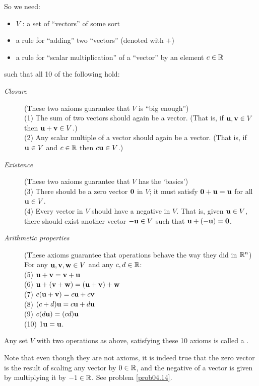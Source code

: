 So we need: 
\begin{itemize}
\item $V$ : a set of ``vectors'' of some sort
\item a rule for ``adding'' two ``vectors'' (denoted with $+$)
\item a rule for ``scalar multiplication'' of a ``vector'' by an element $c\in \mathbb{R}$
\end{itemize}
such that all 10 of the following  hold:
\begin{description}
\item[\it Closure] (These two axioms guarantee that $V$ is ``big enough'')\\
(1) The sum of two vectors should again be a vector.  (That is, if $\mathbf{u}, \mathbf{v} \in V$ then $\mathbf{u} + \mathbf{v} \in V$.)\\
(2) Any scalar multiple of a vector should again be a vector.  (That is, if $\mathbf{u} \in V$ and $c\in \mathbb{R}$ then $c\mathbf{u} \in V$.)
\item[\it Existence] (These two axioms guarantee that   $V$ has the `basics')\\
(3) There should be a zero vector $\mathbf{0}$ in $V$; it must satisfy
$\mathbf{0} + \mathbf{u} = \mathbf{u}$ for all $\mathbf{u} \in V$.\\
(4) Every vector in $V$ should have a negative in $V$.  That is, given $\mathbf{u} \in V$, there
should exist another vector $-\mathbf{u} \in V$ such that $\mathbf{u} + (-\mathbf{u}) = \mathbf{0}$.
\item[\it Arithmetic properties] (These axioms guarantee that operations behave the way they did in $\mathbb{R}^n$)\\
For any $\mathbf{u}, \mathbf{v}, \mathbf{w} \in V$ and any $c,d\in \mathbb{R}$:\\
(5) $\mathbf{u} + \mathbf{v} = \mathbf{v} + \mathbf{u}$\\
(6) $\mathbf{u} + (\mathbf{v} + \mathbf{w}) = (\mathbf{u}+\mathbf{v})+\mathbf{w}$\\
(7) $c(\mathbf{u} + \mathbf{v}) = c\mathbf{u} + c\mathbf{v}$\\
(8) $(c+d)\mathbf{u} = c\mathbf{u} + d\mathbf{u}$\\
(9) $c(d\mathbf{u}) = (cd)\mathbf{u}$\\
(10) $1\mathbf{u} = \mathbf{u}$.
\end{description}

\begin{definition}
Any set $V$ with two operations as above, satisfying these 10 axioms is
called a .
\end{definition}

Note that even though they are not axioms, it is indeed true that the zero vector is  the result of
scaling any vector by $0 \in \mathbb{R}$, and the negative of a vector
is given by multiplying it by $-1 \in \mathbb{R}$. See problem  \ref{prob04.14}.

